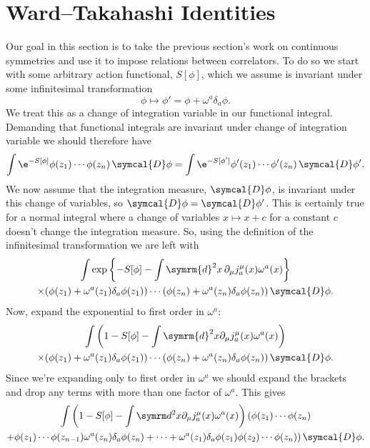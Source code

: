 \documentclass[fleqn]{NotesClass}
\renewcommand{\dl}[1]{\symrm{d}#1}
\newcommand{\DL}{\symcal{D}}
\newcommand{\DD}{\,\symcal{D}}
\begin{document}
    \section{Ward--Takahashi Identities}
    Our goal in this section is to take the previous section's work on continuous symmetries and use it to impose relations between correlators.
    To do so we start with some arbitrary action functional, \(S[\phi]\), which we assume is invariant under some infinitesimal transformation
    \begin{equation}
        \phi \mapsto \phi' = \phi + \omega^a \delta_a \phi.
    \end{equation}
    We treat this as a change of integration variable in our functional integral.
    Demanding that functional integrals are invariant under change of integration variable we should therefore have
    \begin{equation}
        \int \e^{-S[\phi]}\phi(z_1) \dotsm \phi(z_n) \DD\phi = \int \e^{-S[\phi']} \phi'(z_1) \dotsm \phi'(z_n) \DD\phi'.
    \end{equation}
    We now assume that the integration measure, \(\DL\phi\), is invariant under this change of variables, so \(\DL\phi = \DL\phi'\).
    This is certainly true for a normal integral where a change of variables \(x \mapsto x + c\) for a constant \(c\) doesn't change the integration measure.
    So, using the definition of the infinitesimal transformation we are left with
    \begin{multline}
        \int \exp\left\{ -S[\phi] - \int \dl{^2x} \, \partial_\mu j^\mu_a(x) \omega^a(x) \right\}\\
        \times(\phi(z_1) + \omega^a(z_1) \delta_a\phi(z_1)) \dotsm (\phi(z_n) + \omega^a(z_n) \delta_a\phi(z_n)) \DD\phi.
    \end{multline}
    Now, expand the exponential to first order in \(\omega^a\):
    \begin{multline}
        \int \left( 1 - S[\phi] - \int \dl{^2x} \partial_\mu j^\mu_a(x) \omega^a(x) \right)\\
        \times(\phi(z_1) + \omega^a(z_1) \delta_a\phi(z_1)) \dotsm (\phi(z_n) + \omega^a(z_n) \delta_a\phi(z_n)) \DD\phi.
    \end{multline}
    Since we're expanding only to first order in \(\omega^a\) we should expand the brackets and drop any terms with more than one factor of \(\omega^a\).
    This gives
    \begin{multline}
        \int \left( 1 - S[\phi] - \int \dl^2x \partial_\mu j^\mu_a(x) \omega^a(x) \right) (\phi(z_1) \dotsm \phi(z_n)\\
        + \phi(z_1) \dotsm \phi(z_{n-1}) \omega^a(z_n)\delta_a\phi(z_n) + \dotsb + \omega^a(z_1)\delta_a\phi(z_1) \phi(z_2) \dotsm \phi(z_n)) \DD\phi.
    \end{multline}
\end{document}
